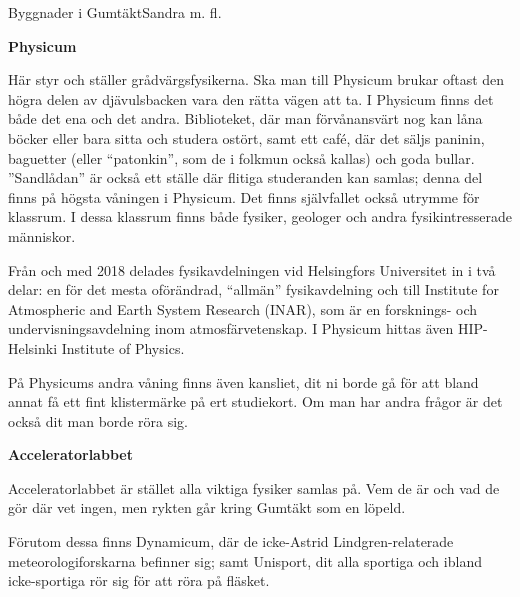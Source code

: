 \documentclass{spektraklet}
\begin{document}
\begin{artikel}{Byggnader i Gumtäkt}{Sandra m. fl.}

\textbf{Physicum}

Här styr och ställer grådvärgsfysikerna. Ska man till Physicum brukar oftast den högra delen av djävulsbacken vara den rätta vägen att ta. I Physicum finns det både det ena och det andra. Biblioteket, där man förvånansvärt nog kan låna böcker eller bara sitta och studera ostört, samt ett café, där det säljs paninin, baguetter (eller ``patonkin'', som de i folkmun också kallas) och goda bullar. ”Sandlådan” är också ett ställe där flitiga studeranden kan samlas; denna del finns på högsta våningen i Physicum. Det finns självfallet också utrymme för klassrum. I dessa klassrum finns både fysiker, geologer och andra fysikintresserade människor.

Från och med 2018 delades fysikavdelningen vid Helsingfors Universitet in i två delar: en för det mesta oförändrad, “allmän” fysikavdelning och till Institute for Atmospheric and Earth System Research (INAR), som är en forsknings- och undervisningsavdelning inom atmosfärvetenskap. I Physicum hittas även HIP- Helsinki Institute of Physics.

På Physicums andra våning finns även kansliet, dit ni borde gå för att bland annat få ett fint klistermärke på ert studiekort. Om man har andra frågor är det också dit man borde röra sig. 


\textbf{Acceleratorlabbet}

Acceleratorlabbet är stället alla viktiga fysiker samlas på. Vem de är och vad de gör där vet ingen, men rykten går kring Gumtäkt som en löpeld.

Förutom dessa finns Dynamicum, där de icke-Astrid Lindgren-relaterade meteorologiforskarna befinner sig; samt Unisport, dit alla sportiga och ibland icke-sportiga rör sig för att röra på fläsket.

\end{artikel}
\end{document}
